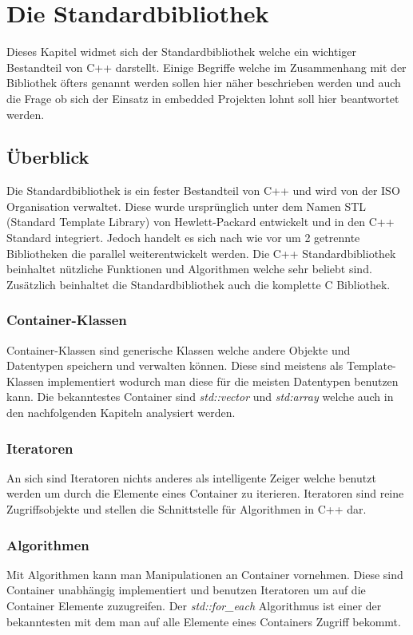 \documentclass[MES,Master,ngerman]{twbook}%
\begin{document}
\section{Die Standardbibliothek}
Dieses Kapitel widmet sich der Standardbibliothek welche ein wichtiger Bestandteil von C++ darstellt. Einige Begriffe welche im Zusammenhang mit der Bibliothek öfters genannt werden sollen hier näher beschrieben werden und auch die Frage ob sich der Einsatz in embedded Projekten lohnt soll hier beantwortet werden.
\subsection{Überblick}
Die Standardbibliothek is ein fester Bestandteil von C++ und wird von der ISO Organisation verwaltet. Diese wurde ursprünglich unter dem Namen STL (Standard Template Library) von Hewlett-Packard entwickelt und in den C++ Standard integriert. Jedoch handelt es sich nach wie vor um 2 getrennte Bibliotheken die parallel weiterentwickelt werden. Die C++ Standardbibliothek beinhaltet nützliche Funktionen und Algorithmen welche sehr beliebt sind. Zusätzlich beinhaltet die Standardbibliothek auch die komplette C Bibliothek. 

\subsubsection{Container-Klassen}
Container-Klassen sind generische Klassen welche andere Objekte und Datentypen speichern und verwalten können. Diese sind meistens als Template-Klassen implementiert wodurch man diese für die meisten Datentypen benutzen kann. Die bekanntestes Container sind \textit{std::vector} und \textit{std:array} welche auch in den nachfolgenden Kapiteln analysiert werden.
\subsubsection{Iteratoren}
An sich sind Iteratoren nichts anderes als intelligente Zeiger welche benutzt werden um durch die Elemente eines Container zu iterieren. Iteratoren sind reine Zugriffsobjekte und stellen die Schnittstelle für Algorithmen in C++ dar.
\subsubsection{Algorithmen}
Mit Algorithmen kann man Manipulationen an Container vornehmen. Diese sind Container unabhängig implementiert und benutzen Iteratoren um auf die Container Elemente zuzugreifen. Der \textit{std::for\_each} Algorithmus ist einer der bekanntesten mit dem man auf alle Elemente eines Containers Zugriff bekommt.
\end{document}
